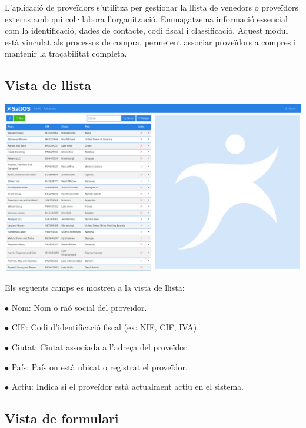 \documentclass[a4paper]{article}
\begin{document}
L'aplicació de proveïdors s'utilitza per gestionar la llista de venedors o proveïdors externs amb qui col·labora l'organització.
Emmagatzema informació essencial com la identificació, dades de contacte, codi fiscal i classificació.
Aquest mòdul està vinculat als processos de compra, permetent associar proveïdors a compres i mantenir la traçabilitat completa.

\hypertarget{toc128}{}
\subsection{Vista de llista}

\begin{center}\includegraphics[width=1\textwidth]{../ujest/snaps/test-screenshots-js-screenshots-purchases-suppliers-list-ca-es-1-snap.png}\end{center}

Els següents camps es mostren a la vista de llista:

\begin{compactitem}
\item[\color{myblue}$\bullet$] Nom: Nom o raó social del proveïdor.
\item[\color{myblue}$\bullet$] CIF: Codi d'identificació fiscal (ex: NIF, CIF, IVA).
\item[\color{myblue}$\bullet$] Ciutat: Ciutat associada a l'adreça del proveïdor.
\item[\color{myblue}$\bullet$] País: País on està ubicat o registrat el proveïdor.
\item[\color{myblue}$\bullet$] Actiu: Indica si el proveïdor està actualment actiu en el sistema.
\end{compactitem}

\hypertarget{toc129}{}
\subsection{Vista de formulari}
\end{document}
